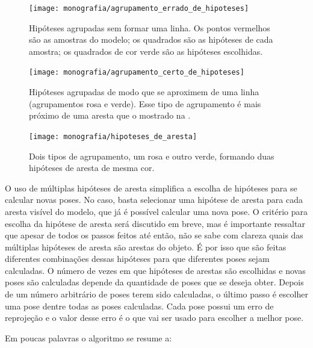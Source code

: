 \begin{figure}[!ht]
\centering\texttt{[image: monografia/agrupamento\_errado\_de\_hipoteses]}
\caption{Hipóteses agrupadas sem formar uma linha. Os pontos vermelhos são as amostras do modelo; os quadrados são as hipóteses de cada amostra; os quadrados de cor verde são as hipóteses escolhidas.}
\label{agrupamento_errado_de_hipoteses}
\end{figure}

\begin{figure}[!ht]
\centering\texttt{[image: monografia/agrupamento\_certo\_de\_hipoteses]}
\caption{Hipóteses agrupadas de modo que se aproximem de uma linha (agrupamentos rosa e verde). Esse tipo de agrupamento é mais próximo de uma aresta que o mostrado na .}
\label{agrupamento_certo_de_hipoteses}
\end{figure}

\begin{figure}[!ht]
\centering\texttt{[image: monografia/hipoteses\_de\_aresta]}
\caption{Dois tipos de agrupamento, um rosa e outro verde, formando duas hipóteses de aresta de mesma cor.}
\label{hipoteses_de_aresta}
\end{figure}

O uso de múltiplas hipóteses de aresta simplifica a escolha de hipóteses para se calcular novas poses. No caso, basta selecionar uma hipótese de aresta para cada aresta visível do modelo, que já é possível calcular uma nova pose. O critério para escolha da hipótese de aresta será discutido em breve, mas é importante ressaltar que apesar de todos os passos feitos até então, não se sabe com clareza quais das múltiplas hipóteses de aresta são arestas do objeto. É por isso que são feitas diferentes combinações dessas hipóteses para que diferentes poses sejam calculadas. O número de vezes em que hipóteses de arestas são escolhidas e novas poses são calculadas depende da quantidade de poses que se deseja obter. Depois de um número arbitrário de poses terem sido calculadas, o último passo é escolher uma pose dentre todas as poses calculadas. Cada pose possui um erro de reprojeção e o valor desse erro é o que vai ser usado para escolher a melhor pose.

Em poucas palavras o algoritmo se resume a:

